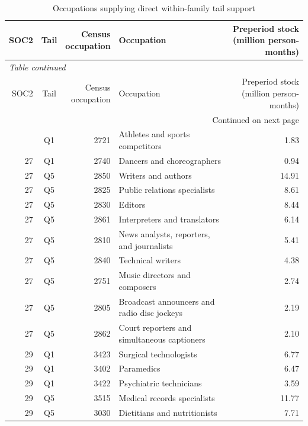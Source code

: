 \begin{center}
\scriptsize
\begin{longtable}{@{}r c r p{} r@{}}
\caption{Occupations supplying direct within-family tail support}\label{tab:app_direct_tail_occupations}\\
\toprule
SOC2 & Tail & \shortstack{Census\\occupation} & Occupation & \shortstack{Preperiod stock\\(million person-months)} \\
\midrule
\endfirsthead
\multicolumn{5}{l}{\footnotesize\itshape Table \thetable{} continued}\\
\toprule
SOC2 & Tail & \shortstack{Census\\occupation} & Occupation & \shortstack{Preperiod stock\\(million person-months)} \\
\midrule
\endhead
\midrule\multicolumn{5}{r}{\footnotesize Continued on next page}\\
\endfoot
\bottomrule
\endlastfoot
27 & Q1 & 2721 & Athletes and sports competitors & 1.83 \\
27 & Q1 & 2740 & Dancers and choreographers & 0.94 \\
27 & Q5 & 2850 & Writers and authors & 14.91 \\
27 & Q5 & 2825 & Public relations specialists & 8.61 \\
27 & Q5 & 2830 & Editors & 8.44 \\
27 & Q5 & 2861 & Interpreters and translators & 6.14 \\
27 & Q5 & 2810 & News analysts, reporters, and journalists & 5.41 \\
27 & Q5 & 2840 & Technical writers & 4.38 \\
27 & Q5 & 2751 & Music directors and composers & 2.74 \\
27 & Q5 & 2805 & Broadcast announcers and radio disc jockeys & 2.19 \\
27 & Q5 & 2862 & Court reporters and simultaneous captioners & 2.10 \\
29 & Q1 & 3423 & Surgical technologists & 6.77 \\
29 & Q1 & 3402 & Paramedics & 6.47 \\
29 & Q1 & 3422 & Psychiatric technicians & 3.59 \\
29 & Q5 & 3515 & Medical records specialists & 11.77 \\
29 & Q5 & 3030 & Dietitians and nutritionists & 7.71 \\

\end{longtable}
\end{center}
